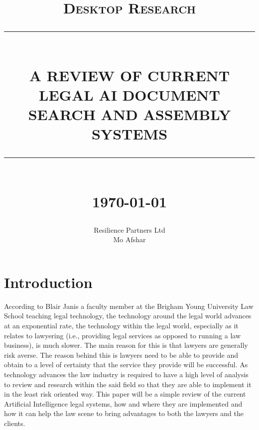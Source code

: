 \documentclass[12pt]{article}
\newcommand{\HRule}[1]{\rule{\linewidth}{#1}}
\begin{document}
\title{ \normalsize \textsc{Desktop Research}
		\\ [2.0cm]
		\HRule{0.5pt} \\
		\LARGE \textbf{\uppercase{A review of current legal AI document search and assembly systems}}
		\HRule{2pt} \\ [0.5cm]
		\normalsize \today \vspace*{5\baselineskip}}

\date{}

\author{
		Resilience Partners Ltd \\ 
		Mo Afshar\\
				 }

\maketitle
\newpage
\tableofcontents
\newpage

\sectionfont{\scshape}


\section{Introduction}
According to Blair Janis a faculty member at the Brigham Young University Law School teaching legal technology, the technology around the legal world advances at an exponential rate, the technology within the legal world, especially as it relates to lawyering (i.e., providing legal services as opposed to running a law business), is much slower. The main reason for this is that lawyers are generally risk averse. The reason behind this is lawyers need to be able to provide and obtain to a level of certainty that the service they provide will be successful. 
\newline
\newline
As technology advances the law industry is required to have a high level of analysis to review and research within the said field so that they are able to implement it in the least risk oriented way. This paper will be a simple review of the current Artificial Intelligence legal systems, how and where they are implemented and how it can help the law scene to bring advantages to both the lawyers and the clients. 
\newpage
\end{document}
